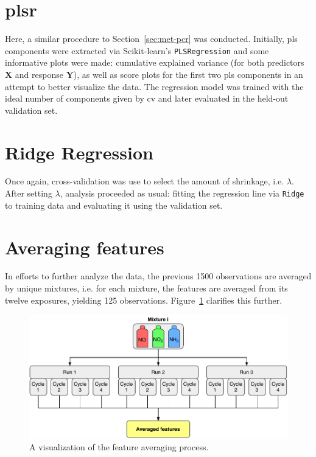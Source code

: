 \section{\acrlong{plsr}}
\label{sec:met-plsr}

Here, a similar procedure to Section~\ref{sec:met-pcr} was conducted. Initially, \acrshort{pls} components were extracted via Scikit-learn's \texttt{PLSRegression} and some informative plots were made: cumulative explained variance (for both predictors $\mathbf{X}$ and response $\mathbf{Y}$), as well as score plots for the first two \acrshort{pls} components in an attempt to better visualize the data. The regression model was trained with the ideal number of components given by \acrshort{cv} and later evaluated in the held-out validation set.

\section{Ridge Regression}
\label{sec:met-ridge}

Once again, cross-validation was use to select the amount of shrinkage, i.e. $\lambda$. After setting $\lambda$, analysis proceeded as usual: fitting the regression line via \texttt{Ridge} to training data and evaluating it using the validation set.

\section{Averaging features}
\label{sec:met-avg}

In efforts to further analyze the data, the previous 1500 observations are averaged by unique mixtures, i.e. for each mixture, the features are averaged from its twelve exposures, yielding 125 observations. Figure~\ref{fig:averaging-process} clarifies this further.

\begin{figure}[h]
	\centering
	\includegraphics[width=1\textwidth]{../figures/averaging-process.pdf}
	\caption{A visualization of the feature averaging process.}
	\label{fig:averaging-process}
\end{figure}


